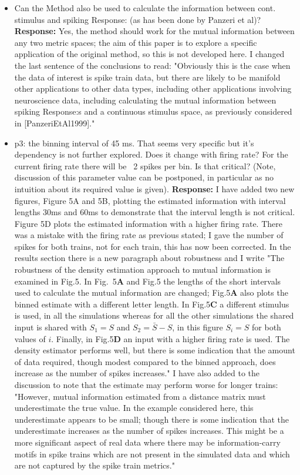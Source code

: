 \documentclass[12pt]{article}
\begin{document}
\begin{itemize}

\item Can the Method also be used to calculate the information between
  cont. stimulus and spiking Response: (as has been done by Panzeri et
  al)? \textbf{Response:} Yes, the method should work for the mutual
  information between any two metric spaces; the aim of this paper is
  to explore a specific application of the original method, so this is
  not developed here. I changed the last sentence of the conclusions
  to read: "Obviously this is the case when the data of interest is
  spike train data, but there are likely to be manifold other
  applications to other data types, including other applications
  involving neuroscience data, including calculating the mutual
  information between spiking Response:s and a continuous stimulus
  space, as previously considered in [PanzeriEtAl1999]."

\item p3: the binning interval of 45 ms. That seems very specific but it's
dependency is not further explored. Does it change with firing rate?
For the current firing rate there will be ~2 spikes per bin. Is that
critical?  (Note, discussion of this parameter value can be postponed,
in particular as no intuition about its required value is given).  \textbf{Response:} I have added two new figures, Figure 5A and 5B, plotting the
   estimated information with interval lengths 30ms and 60ms to
   demonstrate that the interval length is not critical. Figure 5D
   plots the estimated information with a higher firing rate. There
   was a mistake with the firing rate as previous stated; I gave the
   number of spikes for both trains, not for each train, this has now
   been corrected. In the results section there is a new paragraph
   about robustness and I write "The robustness of the density
   estimation approach to mutual information is examined in
   Fig.5. In Fig.~5\textbf{A} and Fig.5
   the lengths of the short intervals used to calculate the mutual
   information are changed; Fig.5\textbf{A} also plots the binned
   estimate with a different letter length. In Fig.5\textbf{C} a
   different stimulus is used, in all the simulations whereas for all
   the other simulations the shared input is shared with $S_1=S$ and
   $S_2=\bar{S}-S$, in this figure $S_i=S$ for both values of
   $i$. Finally, in Fig.5\textbf{D} an input with a higher firing rate
   is used. The density estimator performs well, but there is some
   indication that the amount of data required, though modest compared
   to the binned approach, does increase as the number of spikes
   increases." I have also added to the discussion to note that the
   estimate may perform worse for longer trains: "However, mutual
   information estimated from a distance matrix must underestimate the
   true value. In the example considered here, this underestimate
   appears to be small; though there is some indication that the
   underestimate increases as the number of spikes increases. This
   might be a more significant aspect of real data where there may be
   information-carry motifs in spike trains which are not present in
   the simulated data and which are not captured by the spike train
   metrics."


\end{itemize}
\end{document}
